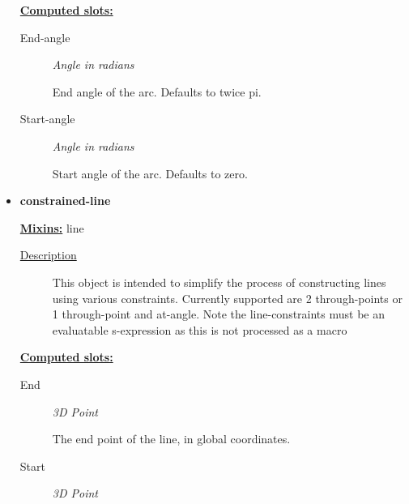\documentclass [11pt]{book}
\begin{document}
\begin{itemize}
\textbf{
\underline{Computed slots:}}

\begin{description}

\item [End-angle]
\emph{Angle in radians}

 End angle of the arc. Defaults to twice pi.




\item [Start-angle]
\emph{Angle in radians}

 Start angle of the arc. Defaults to zero.




\end{description}







\item {}
\label{prim:constrained-line}
\textbf{constrained-line}


\textbf{
\underline{Mixins:}} line





\begin{description}

\item [
\underline{Description}]


This object is intended to simplify the process of
   constructing lines using various constraints. Currently supported
   are 2 through-points or 1 through-point and at-angle. Note the
   line-constraints must be an evaluatable s-expression as this is not
   processed as a macro



\end{description}








\textbf{
\underline{Computed slots:}}

\begin{description}

\item [End]
\emph{3D Point}

 The end point of the line, in global coordinates.




\item [Start]
\emph{3D Point}


\end{description}
\end{itemize}
\end{document}
